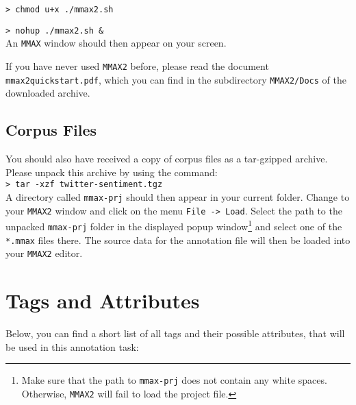 \documentclass[11pt,a4paper]{article}
\begin{document}
\texttt{> chmod u+x ./mmax2.sh}

\texttt{> nohup ./mmax2.sh \&} \\\newline
       {\setlength{\parindent}{0pt}An \texttt{MMAX} window should then
         appear on your screen.}

If you have never used \texttt{MMAX2} before, please read the document
\texttt{mmax2quickstart.pdf}, which you can find in the subdirectory
\texttt{MMAX2/Docs} of the downloaded archive.

\subsection{Corpus Files}

You should also have received a copy of corpus files as a tar-gzipped
archive.  Please unpack this archive by using the command:\\\newline
\texttt{> tar -xzf twitter-sentiment.tgz}\\\newline
       {\setlength{\parindent}{0pt} A directory called
         \texttt{mmax-prj} should then appear in your current folder.
         Change to your \texttt{MMAX2} window and click on the menu
         \texttt{File -> Load}.  Select the path to the unpacked
         \texttt{mmax-prj} folder in the displayed popup
         window\footnote{Make sure that the path to \texttt{mmax-prj}
           does not contain any white spaces.  Otherwise,
           \texttt{MMAX2} will fail to load the project file.} and
         select one of the \texttt{*.mmax} files there. The source
         data for the annotation file will then be loaded into your
         \texttt{MMAX2} editor.}


\section{Tags and Attributes}\label{sec:markables}
Below, you can find a short list of all tags and their possible
attributes, that will be used in this annotation task:
\end{document}
